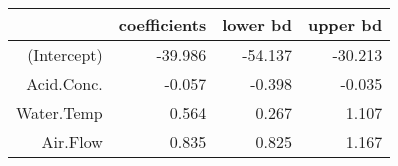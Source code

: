 \begin{table}[ht]
\centering
\begin{tabular}{rrrr}
  \hline
 & coefficients & lower bd & upper bd \\ 
  \hline
(Intercept) & -39.986 & -54.137 & -30.213 \\ 
  Acid.Conc. & -0.057 & -0.398 & -0.035 \\ 
  Water.Temp & 0.564 & 0.267 & 1.107 \\ 
  Air.Flow & 0.835 & 0.825 & 1.167 \\ 
   \hline
\end{tabular}
\end{table}
